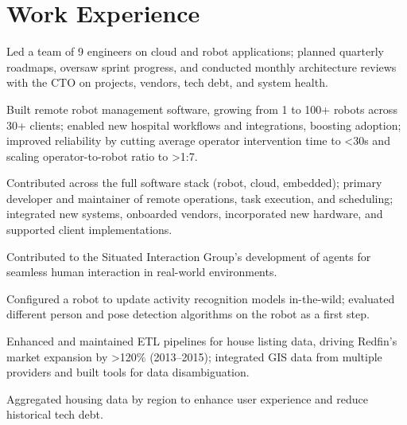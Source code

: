 \documentclass[]{deedy-resume}
\begin{document}
\begin{minipage}[t]{0.66\textwidth}


\section{Work Experience}
\vspace{0.3cm}
\begin{tightemize}
\item Led a team of 9 engineers on cloud and robot applications; planned quarterly roadmaps, oversaw sprint progress, and conducted monthly architecture reviews with the CTO on projects, vendors, tech debt, and system health.
\item Built remote robot management software, growing from 1 to 100+ robots across 30+ clients; enabled new hospital workflows and integrations, boosting adoption; improved reliability by cutting average operator intervention time to <30s and scaling operator-to-robot ratio to >1:7.
\item Contributed across the full software stack (robot, cloud, embedded); primary developer and maintainer of remote operations, task execution, and scheduling; integrated new systems, onboarded vendors, incorporated new hardware, and supported client implementations.
\end{tightemize}
\sectionsep

\begin{tightemize}
\item Contributed to the Situated Interaction Group's development of agents for seamless human interaction in real-world environments.
\item Configured a robot to update activity recognition models in-the-wild; evaluated different person and pose detection algorithms on the robot as a first step.
\end{tightemize}
\sectionsep

\begin{tightemize}
\item Enhanced and maintained ETL pipelines for house listing data, driving Redfin’s market expansion by >120\% (2013–2015); integrated GIS data from multiple providers and built tools for data disambiguation.
\item Aggregated housing data by region to enhance user experience and reduce historical tech debt.
\end{tightemize}
\sectionsep


\end{minipage}
\end{document}

